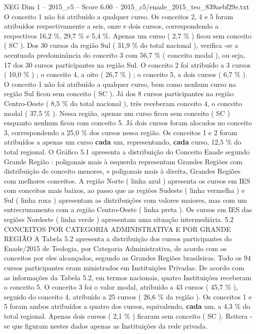 \begin{textsample}{NEG Dim 1 – 2015\_c5 – Score 6.00 – 2015\_c5/enade\_2015\_teo\_839aebf29e.txt}
O conceito 1 não foi atribuído a qualquer curso.
Os conceitos 2, 4 e 5 foram atribuídos respectivamente a seis, onze e dois cursos, correspondendo a respectivos 16,2 \%, 29,7 \% e 5,4 \%.
Apenas um curso ( 2,7 \% ) ficou sem conceito ( SC ).
Dos 30 cursos da região Sul ( 31,9 \% do total nacional ), verifica -se a acentuada predominância do conceito 3 com 56,7 \% ( conceito modal ), ou seja, 17 dos 30 cursos participantes na região Sul.
O conceito 2 foi atribuído a 3 cursos ( 10,0 \% ) ; o conceito 4, a oito ( 26,7 \% ) ; o conceito 5, a dois cursos ( 6,7 \% ).
O conceito 1 não foi atribuído a qualquer curso, bem como nenhum curso na região Sul ficou sem conceito ( SC ).
Já dos 8 cursos participantes na região Centro-Oeste ( 8,5 \% do total nacional ), três receberam conceito 4, o conceito modal ( 37,5 \% ).
Nessa região, apenas um curso ficou sem conceito ( SC ) enquanto nenhum ficou com conceito 5.
Já dois cursos foram alocados no conceito 3, correspondendo a 25,0 \% dos cursos nessa região.
Os conceitos 1 e 2 foram atribuídos a apenas um curso \textbf{cada} um, representando, \textbf{cada} curso, 12,5 \% do total regional.
O Gráfico 5.1 apresenta a distribuição do Conceito Enade segundo Grande Região : poligonais mais à esquerda representam Grandes Regiões com distribuição de conceito menores, e poligonais mais à direita, Grandes Regiões com melhores conceitos.
A região Norte ( linha azul ) apresenta os cursos em IES com conceitos mais baixos, ao passo que as regiões Sudeste ( linha vermelha ) e Sul ( linha roxa ) apresentam as distribuições com valores maiores, mas com um entrecruzamento com a região Centro-Oeste ( linha preta ).
Os cursos em IES das regiões Nordeste ( linha verde ) apresentam uma situação intermediária. 5.2 CONCEITOS POR CATEGORIA ADMINISTRATIVA E POR GRANDE REGIÃO A Tabela 5.2 apresenta a distribuição dos cursos participantes do Enade/2015 de Teologia, por Categoria Administrativa, de acordo com os conceitos por eles alcançados, segundo as Grandes Regiões brasileiras.
Todo os 94 cursos participantes eram ministrados em Instituições Privadas.
De acordo com as informações da Tabela 5.2, em termos nacionais, quatro Instituições receberam o conceito 5.
O conceito 3 foi o valor modal, atribuído a 43 cursos ( 45,7 \% ), seguido do conceito 4, atribuído a 25 cursos ( 26,6 \% da região ).
Os conceitos 1 e 5 foram ambos atribuídos a quatro dos cursos, equivalendo, \textbf{cada} um, a 4,3 \% do total regional.
Apenas dois cursos ( 2,1 \% ) ficaram sem conceito ( SC ).
Reitera -se que figuram nestes dados apenas as Instituições da rede privada.

\end{textsample}
